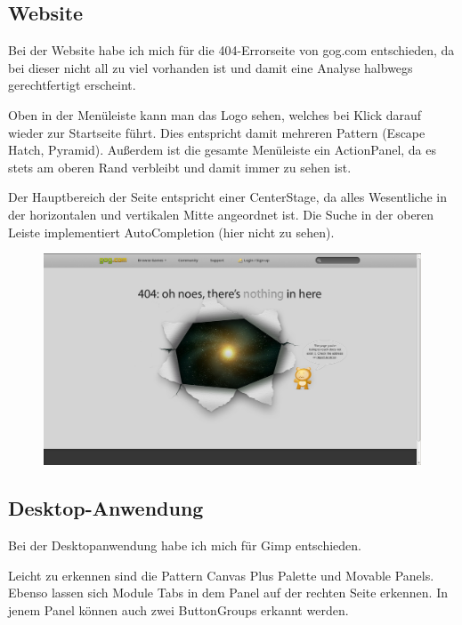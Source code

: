 \documentclass[a4paper,10pt]{scrartcl}
\begin{document}
\kopf
\renewcommand{\figurename}{Figure}


\subsection*{Website}

Bei der Website habe ich mich für die 404-Errorseite von gog.com entschieden, da bei dieser nicht all zu viel vorhanden ist und damit eine Analyse halbwegs gerechtfertigt erscheint.

Oben in der Menüleiste kann man das Logo sehen, welches bei Klick darauf wieder zur Startseite führt. Dies entspricht damit mehreren Pattern (Escape Hatch, Pyramid). Außerdem ist die gesamte Menüleiste ein ActionPanel, da es stets am oberen Rand verbleibt und damit immer zu sehen ist.

Der Hauptbereich der Seite entspricht einer CenterStage, da alles Wesentliche in der horizontalen und vertikalen Mitte angeordnet ist. Die Suche in der oberen Leiste implementiert AutoCompletion (hier nicht zu sehen).
\begin{figure}[htp]
	\includegraphics[scale=0.35]{ID-GOG-404}
\end{figure}

\subsection*{Desktop-Anwendung}

Bei der Desktopanwendung habe ich mich für Gimp entschieden.

Leicht zu erkennen sind die Pattern Canvas Plus Palette und Movable Panels. Ebenso lassen sich Module Tabs in dem Panel auf der rechten Seite erkennen.
In jenem Panel können auch zwei ButtonGroups erkannt werden.
\end{document}
